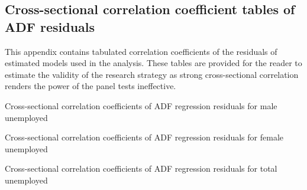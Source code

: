 \documentclass[12pt,a4paper,english]{article}
\begin{document}
\begin{appendices}
\clearpage

\section{Cross-sectional correlation coefficient tables of ADF residuals}\label{CORRtables}

This appendix contains tabulated correlation coefficients of the residuals of estimated models used in the analysis. These tables are provided for the reader to estimate the validity of the research strategy as strong cross-sectional correlation renders the power of the panel tests ineffective.




\begin{table}[H]
\centering

\caption{Cross-sectional correlation coefficients of ADF regression residuals for male unemployed}
\end{table}

\begin{table}[H]
\centering

\caption{Cross-sectional correlation coefficients of ADF regression residuals for female unemployed}
\end{table}

\begin{table}[H]
\centering

\caption{Cross-sectional correlation coefficients of ADF regression residuals for total unemployed}
\end{table}
\end{appendices}
\end{document}
